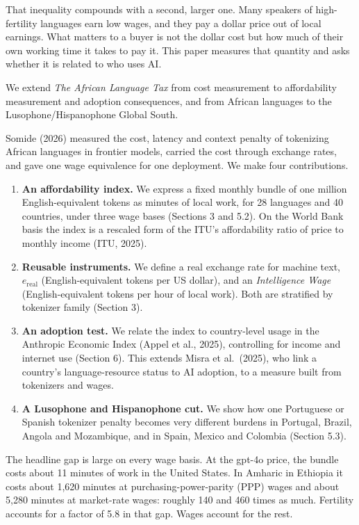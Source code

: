 \documentclass[11pt]{article}
\providecommand{\tightlist}{\setlength{\itemsep}{0pt}\setlength{\parskip}{0pt}}
\begin{document}
That inequality compounds with a second, larger one. Many speakers of high-fertility languages earn low wages, and they pay a dollar price out of local earnings. What matters to a buyer is not the dollar cost but how much of their own working time it takes to pay it. This paper measures that quantity and asks whether it is related to who uses AI.

We extend \emph{The African Language Tax} from cost measurement to affordability measurement and adoption consequences, and from African languages to the Lusophone/Hispanophone Global South.

Somide (2026) measured the cost, latency and context penalty of tokenizing African languages in frontier models, carried the cost through exchange rates, and gave one wage equivalence for one deployment. We make four contributions.

\begin{enumerate}
\def\labelenumi{\arabic{enumi}.}
\tightlist
\item
  \textbf{An affordability index.} We express a fixed monthly bundle of one million English-equivalent tokens as minutes of local work, for 28 languages and 40 countries, under three wage bases (Sections 3 and 5.2). On the World Bank basis the index is a rescaled form of the ITU's affordability ratio of price to monthly income (ITU, 2025).
\item
  \textbf{Reusable instruments.} We define a real exchange rate for machine text, \(e_{\text{real}}\) (English-equivalent tokens per US dollar), and an \emph{Intelligence Wage} (English-equivalent tokens per hour of local work). Both are stratified by tokenizer family (Section 3).
\item
  \textbf{An adoption test.} We relate the index to country-level usage in the Anthropic Economic Index (Appel et al., 2025), controlling for income and internet use (Section 6). This extends Misra et al.~(2025), who link a country's language-resource status to AI adoption, to a measure built from tokenizers and wages.
\item
  \textbf{A Lusophone and Hispanophone cut.} We show how one Portuguese or Spanish tokenizer penalty becomes very different burdens in Portugal, Brazil, Angola and Mozambique, and in Spain, Mexico and Colombia (Section 5.3).
\end{enumerate}

The headline gap is large on every wage basis. At the gpt-4o price, the bundle costs about 11 minutes of work in the United States. In Amharic in Ethiopia it costs about 1,620 minutes at purchasing-power-parity (PPP) wages and about 5,280 minutes at market-rate wages: roughly 140 and 460 times as much. Fertility accounts for a factor of 5.8 in that gap. Wages account for the rest.
\end{document}
